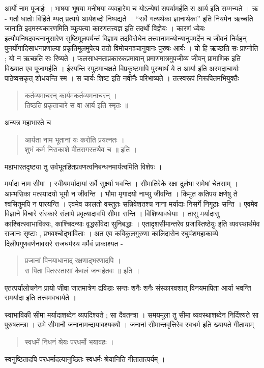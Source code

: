 {आर्यो नाम पूजार्हः । भाषया भूषया मनीषया व्यवहारेण च योऽन्येषां सपर्यामर्हति स आर्य इति सम्मन्यते । ऋ - गतौ धातोः विहिते ण्यत् प्रत्यये आर्यशब्दो निष्पद्यते । “सर्वे गत्यर्थका ज्ञानार्थका” इति नियमेन ऋच्चति जानाति इदमस्यकारणमिति व्युत्पत्या कारणतत्त्वज्ञ इति तदर्थो विज्ञेयः । कारणं ध्येयः इत्यौपनिषदवचनानुसारेण सृष्टिमूलपर्यन्तं विज्ञाय तदविरोधेन तत्त्वानामन्योन्यानुपमर्देन च जीवनं निर्वहन् पुनर्योगादिसाधनप्रणाल्या प्रकृतिमूलमुपेत्य ततो विमोचनञ्चानुवानः पुरुषः आर्यः । यो हि ऋच्छति सः प्राप्नोति ; यो न ऋच्छति सः रिष्यते । फलसाधनताप्रकारकप्रमावान् प्रमाणमात्रमुपजीव्य जीवन् प्रामाणिक इति विख्यात एव पूजामर्हति । ईरयन्ति स्पुटमाचक्षते विप्रकृष्टमापि पुरुषार्थं ये त आर्या इति अस्मदाचार्याः पाठेष्वसकृत् शोधयन्ति स्म । स चार्यः शिष्ट इति नवीनैः परिभाष्यते । तत्स्वरूपं निरूपितमभियुक्तैः 
\begin{verse}
कर्तव्यमाचरन् कार्यमकर्तव्यमनाचरन् ।\\
तिष्ठति प्रकृताचारे स वा आर्य इति स्मृतः ॥
\end{verse}
अन्यत्र महाभारते च  
\begin{verse}
आर्यता नाम भूतानां यः करोति प्रयत्नतः ।\\
शुभं कर्म निराकाशे वीतरागस्तथैव च ॥ इति ।
\end{verse}
महाभारतदृष्ट्या तु सर्वभूतहितप्रवणत्वनिबन्धनमार्यत्वमिति विशेषः ।

मर्यादा नाम सीमा । स्वीयमर्यादायां सर्वे सुर्क्ष्या भवन्ति । सीमातिरेके रक्षा दुर्लभा समेषां चेतसाम् । आम्भसिका मत्स्यादयो भूमौ न जीवन्ति । भौमा मृगादयो नाप्सु जीवन्ति । किमुत कतिपय क्षणेषु ते श्वसितुमपि न पारयन्ति । एवमेव कालतो वस्तुतः सन्निवेशतश्च नाना मर्यादाः निसर्गे निगूढाः सन्ति । एवमेव विज्ञाने विचारे संस्कारे संलापे प्रवृत्यादावपि सीमाः सन्ति । विशिष्यावधेयाः । तासु मर्यादासु काश्चित्स्वाभाविक्यः, काश्चिदन्याः वृद्धसंविदा सुनिबद्धाः । एतादृशसीमान्तरेव प्रजास्तिष्ठेयुः इति व्यवस्थार्थमेव राजानः सृष्टाः , प्रभवश्चोद्भाविताः । अत एव कविकुलगुरुणा कालिदासेन रघुवंशमहाकाव्ये दिलीपगुणवर्णनावसरे राजधर्मस्य मर्मैवं प्राकाश्यत -
\begin{verse}
प्रजानां विनयाधानाद् रक्षणाद्भरणादपि ।\\ 
स पिता पितरस्तासां केवलं जन्महेतवः ॥ इति ।
\end{verse}
एतत्पर्यालोचनेन प्रायो जीवा जातमात्रेण द्रविडाः सन्तः शनैः शनैः संस्कारवशात् विनयमापिता आर्या भवन्ति समर्यादा इति तत्त्वमवधार्यते ।

स्वाभाविकी सीमा मर्यादाशब्देन व्यपदिश्यते ; सा दैवतन्त्रा । समयमूला तु सीमा व्यवस्थाशब्देन निर्दिश्यते सा पुरुषतन्त्रा ।  उभे सीमानौ जनानामन्दायावश्यक्यौ । जनानां सीमान्तवृत्तिरेव स्वधर्म इति ख्यायते गीतायाम्  
\begin{verse}
स्वधर्मे निधनं श्रेयः परधर्मो भयावहः । 
\end{verse}
स्वनुष्ठितादपि परधर्मादल्पानुष्ठितः स्वधर्मः श्रेयानिति गीतातात्पर्यम् ।

}
